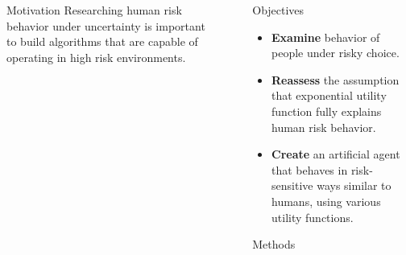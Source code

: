\documentclass[final]{beamer}
\newlength{\sepwid}
\newlength{\onecolwid}
\begin{document}
\begin{frame}
\begin{columns}[t]
\begin{column}{\onecolwid}
\begin{exampleblock}{Motivation}
Researching human risk behavior under uncertainty is important to build algorithms that are capable of operating in high risk environments.



\end{exampleblock}






\end{column} %

\begin{column}{\sepwid}\end{column} %

\begin{column}{\onecolwid} %


\begin{exampleblock}{Objectives}

\begin{itemize}
\item \textbf{Examine} behavior of people under risky choice.
\item \textbf{Reassess} the assumption that exponential utility function fully explains human risk behavior.
\item \textbf{Create} an artificial agent that behaves in risk-sensitive ways similar to humans, using various utility functions.
\end{itemize}

\end{exampleblock}


\begin{exampleblock}{Methods}


\end{exampleblock}
\end{column}
\end{columns}
\end{frame}
\end{document}
